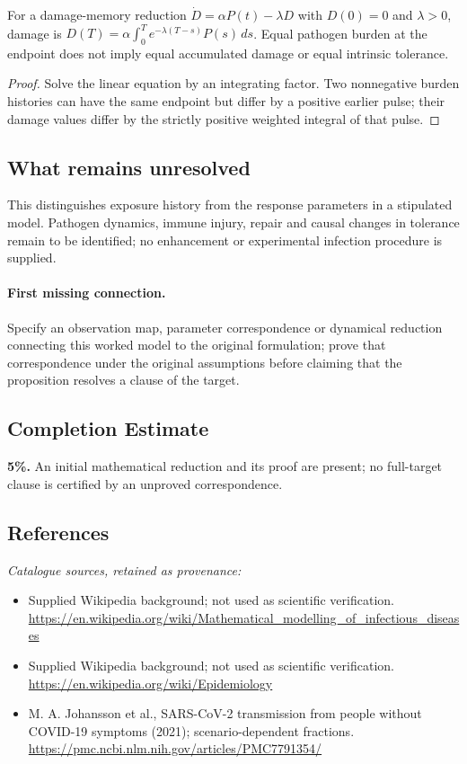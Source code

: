 \documentclass[11pt]{article}
\begin{document}
\begin{proposition}
For a damage-memory reduction $\dot D=\alpha P(t)-\lambda D$ with $D(0)=0$ and $\lambda>0$, damage is $D(T)=\alpha\int_0^T e^{-\lambda(T-s)}P(s)\,ds$. Equal pathogen burden at the endpoint does not imply equal accumulated damage or equal intrinsic tolerance.
\end{proposition}
\begin{proof}
Solve the linear equation by an integrating factor. Two nonnegative burden histories can have the same endpoint but differ by a positive earlier pulse; their damage values differ by the strictly positive weighted integral of that pulse.
\end{proof}
\subsection{What remains unresolved}
This distinguishes exposure history from the response parameters in a stipulated model. Pathogen dynamics, immune injury, repair and causal changes in tolerance remain to be identified; no enhancement or experimental infection procedure is supplied.
\paragraph{First missing connection.} Specify an observation map, parameter correspondence or dynamical reduction connecting this worked model to the original formulation; prove that correspondence under the original assumptions before claiming that the proposition resolves a clause of the target.
\subsection{Completion Estimate}
\textbf{5\%.} An initial mathematical reduction and its proof are present; no full-target clause is certified by an unproved correspondence.
\subsection{References}
\noindent\emph{Catalogue sources, retained as provenance:}
\begin{itemize}
\item Supplied Wikipedia background; not used as scientific verification. \url{https://en.wikipedia.org/wiki/Mathematical_modelling_of_infectious_diseases}
\item Supplied Wikipedia background; not used as scientific verification. \url{https://en.wikipedia.org/wiki/Epidemiology}
\item M. A. Johansson et al., SARS-CoV-2 transmission from people without COVID-19 symptoms (2021); scenario-dependent fractions. \url{https://pmc.ncbi.nlm.nih.gov/articles/PMC7791354/}
\end{itemize}
\end{document}
